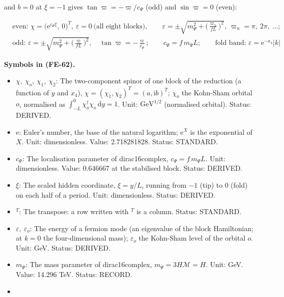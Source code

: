 \documentclass[
  10pt,
]{article}
\providecommand{\tightlist}{%
  \setlength{\itemsep}{0pt}\setlength{\parskip}{0pt}}
\begin{document}
and \(b = 0\) at \(\xi = -1\) gives \(\tan\varpi = -\varpi/c_\Psi\)
(odd) and \(\sin\varpi = 0\) (even):

\[
\begin{aligned}
&\text{even: }\chi = \big(\mathrm{e}^{c_\Psi\xi},\ 0\big)^T,\ \varepsilon = 0\ \text{(all eight
 blocks)},\qquad
 \varepsilon = \pm\sqrt{m_\Psi^2 + \Big(\frac{\varpi_n}{fL}\Big)^2},\ \varpi_n = \pi,\ 2\pi,\ \dots;\\
&\text{odd: }\varepsilon = \pm\sqrt{m_\Psi^2 + \Big(\frac{\varpi}{fL}\Big)^2},\quad \tan\varpi =
 -\frac{\varpi}{c_\Psi};\qquad
 c_\Psi = f\,m_\Psi L;\qquad \text{fold band: }\varepsilon = \mathrm{e}^{-a_4}\lvert k\rvert
\end{aligned} \tag{FE-62}
\]

\textbf{Symbols in (FE-62).}

\begin{itemize}
\tightlist
\item
  \(\chi,\ \chi_o,\ \chi_1,\ \chi_2\): The two-component spinor of one
  block of the reduction (a function of \(y\) and \(x_4\)),
  \(\chi = (\chi_1, \chi_2)^T = (a, \mathrm{i}b)^T\); \(\chi_o\) the
  Kohn-Sham orbital \(o\), normalised as
  \(\int_{-L}^{0}\chi_o^\dagger\chi_o\,\mathrm{d}y = 1\). Unit:
  \(\mathrm{GeV}^{1/2}\) (normalised orbital). Status: DERIVED.
\item
  \(\mathrm{e}\): Euler's number, the base of the natural logarithm;
  \(\mathrm{e}^{X}\) is the exponential of \(X\). Unit: dimensionless.
  Value: 2.718281828. Status: STANDARD.
\item
  \(c_\Psi\): The localisation parameter of dirac16complex,
  \(c_\Psi = f\,m_\Psi L\). Unit: dimensionless. Value: 0.646667 at the
  stabilised block. Status: DERIVED.
\item
  \(\xi\): The scaled hidden coordinate, \(\xi = y/L\), running from
  \(-1\) (tip) to \(0\) (fold) on each half of a period. Unit:
  dimensionless. Status: DERIVED.
\item
  \({}^T\): The transpose: a row written with \(^T\) is a column.
  Status: STANDARD.
\item
  \(\varepsilon,\ \varepsilon_o\): The energy of a fermion mode (an
  eigenvalue of the block Hamiltonian; at \(k = 0\) the four-dimensional
  mass); \(\varepsilon_o\) the Kohn-Sham level of the orbital \(o\).
  Unit: GeV. Status: DERIVED.
\item
  \(m_\Psi\): The mass parameter of dirac16complex,
  \(m_\Psi = 3H\mathcal{M} = H\). Unit: GeV. Value: 14.296 TeV. Status:
  RECORD.
\item

\end{itemize}
\end{document}
